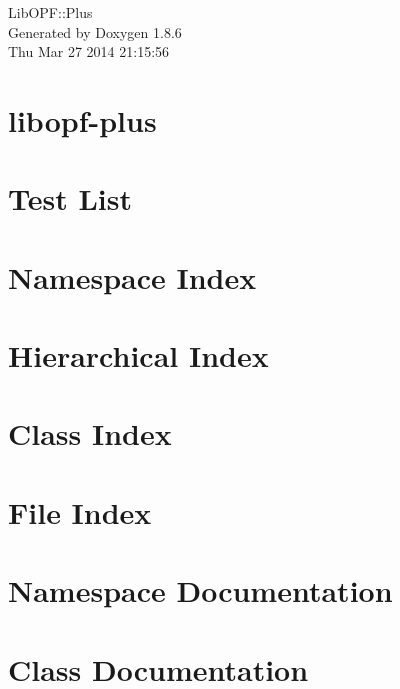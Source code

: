 \documentclass[twoside]{book}
\newcommand{\+}{\discretionary{\mbox{\scriptsize$\hookleftarrow$}}{}{}}
\newcommand{\clearemptydoublepage}{%
  \newpage{\pagestyle{empty}\cleardoublepage}%
}
\begin{document}
\hypersetup{pageanchor=false,
             bookmarks=true,
             bookmarksnumbered=true,
             pdfencoding=unicode
            }
\begin{titlepage}
\vspace*{7cm}
\begin{center}%
{\Large Lib\+O\+P\+F\+:\+:Plus }\\
\vspace*{1cm}
{\large Generated by Doxygen 1.8.6}\\
\vspace*{0.5cm}
{\small Thu Mar 27 2014 21:15:56}\\
\end{center}
\end{titlepage}
\clearemptydoublepage
\tableofcontents
\clearemptydoublepage
{}
\hypersetup{pageanchor=true}

\chapter{libopf-\/plus}
\label{md_README}
\hypertarget{md_README}{}

\chapter{Test List}
\label{test}
\hypertarget{test}{}

\chapter{Namespace Index}

\chapter{Hierarchical Index}

\chapter{Class Index}

\chapter{File Index}

\chapter{Namespace Documentation}

\chapter{Class Documentation}
















\end{document}
